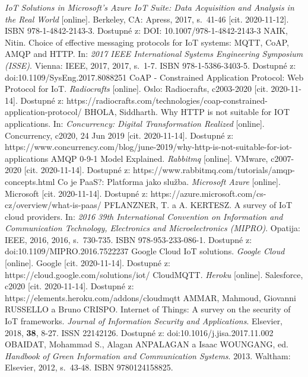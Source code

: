 \documentclass[twoside]{ctuthesis}
\theoremstyle{plain}
\theoremstyle{definition}
\theoremstyle{note}
\begin{document}
\begin{thebibliography}{46}
   \textit{IoT Solutions in Microsoft's Azure IoT Suite: Data Acquisition and Analysis in the Real World} [online]. Berkeley, CA: Apress, 2017, s.~41-46 [cit. 2020-11-12]. ISBN 978-1-4842-2143-3. Dostupné z: DOI: 10.1007/978-1-4842-2143-3
   NAIK, Nitin. Choice of effective messaging protocols for IoT systems: MQTT, CoAP, AMQP and HTTP. In: \textit{2017 IEEE International Systems Engineering Symposium (ISSE)}. Vienna: IEEE, 2017, 2017, s.~1-7. ISBN 978-1-5386-3403-5. Dostupné z: doi:10.1109/SysEng.2017.8088251  
    CoAP - Constrained Application Protocol: Web Protocol for IoT. \textit{Radiocrafts} [online]. Oslo: Radiocrafts, c2003-2020 [cit. 2020-11-14]. Dostupné z: https://radiocrafts.com/technologies/coap-constrained-application-protocol/
     BHOLA, Siddharth. Why HTTP is not suitable for IOT applications. In: \textit{Concurrency: Digital Transformation Realized} [online]. Concurrency, c2020, 24 Jun 2019 [cit. 2020-11-14]. Dostupné z: https://www.concurrency.com/blog/june-2019/why-http-is-not-suitable-for-iot-applications
 AMQP 0-9-1 Model Explained. \textit{Rabbitmq} [online]. VMware, c2007-2020 [cit. 2020-11-14]. Dostupné z: https://www.rabbitmq.com/tutorials/amqp-concepts.html
    Co je PaaS?: Platforma jako služba. \textit{Microsoft Azure} [online]. Microsoft [cit. 2020-11-14]. Dostupné z: https://azure.microsoft.com/cs-cz/overview/what-is-paas/   
    PFLANZNER, T. a A. KERTESZ. A survey of IoT cloud providers. In: \textit{2016 39th International Convention on Information and Communication Technology, Electronics and Microelectronics (MIPRO)}. Opatija: IEEE, 2016, 2016, s.~730-735. ISBN 978-953-233-086-1. Dostupné z: doi:10.1109/MIPRO.2016.7522237
  Google Cloud IoT solutions. \textit{Google Cloud} [online]. Google [cit. 2020-11-14]. Dostupné z: https://cloud.google.com/solutions/iot/
  CloudMQTT. \textit{Heroku} [online]. Salesforce, c2020 [cit. 2020-11-14]. Dostupné z: https://elements.heroku.com/addons/cloudmqtt
 AMMAR, Mahmoud, Giovanni RUSSELLO a Bruno CRISPO. Internet of Things: A survey on the security of IoT frameworks. \textit{Journal of Information Security and Applications}. Elsevier, 2018, \textbf{38}, 8-27. ISSN 22142126. Dostupné z: doi:10.1016/j.jisa.2017.11.002
 OBAIDAT, Mohammad S., Alagan ANPALAGAN a Isaac WOUNGANG, ed. \textit{Handbook of Green Information and Communication Systems}. 2013. Waltham: Elsevier, 2012, s.~43-48. ISBN 9780124158825.

\end{thebibliography}
\end{document}
